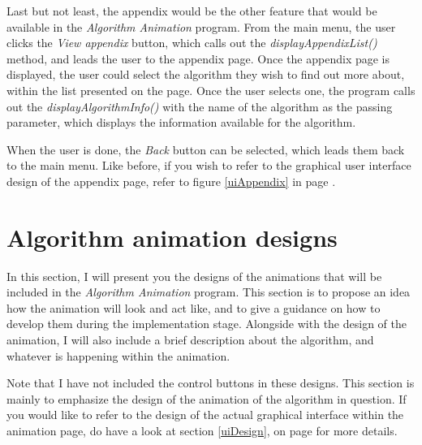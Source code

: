 Last but not least, the appendix would be the other feature that would be available in the \textit{Algorithm Animation} program. From the main menu, the user clicks the \textit{View appendix} button, which calls out the \textit{displayAppendixList()} method, and leads the user to the appendix page. Once the appendix page is displayed, the user could select the algorithm they wish to find out more about, within the list presented on the page. Once the user selects one, the program calls out the \textit{displayAlgorithmInfo()} with the name of the algorithm as the passing parameter, which displays the information available for the algorithm.

When the user is done, the \textit{Back} button can be selected, which leads them back to the main menu. Like before, if you wish to refer to the graphical user interface design of the appendix page, refer to figure \ref{uiAppendix} in page \pageref{uiAppendix}.

\newpage

\section{Algorithm animation designs}
In this section, I will present you the designs of the animations that will be included in the \textit{Algorithm Animation} program. This section is to propose an idea how the animation will look and act like, and to give a guidance on how to develop them during the implementation stage. Alongside with the design of the animation, I will also include a brief description about the algorithm, and whatever is happening within the animation.

Note that I have not included the control buttons in these designs. This section is mainly to emphasize the design of the animation of the algorithm in question. If you would like to refer to the design of the actual graphical interface within the animation page, do have a look at section \ref{uiDesign}, on page \pageref{uiDesign} for more details.

